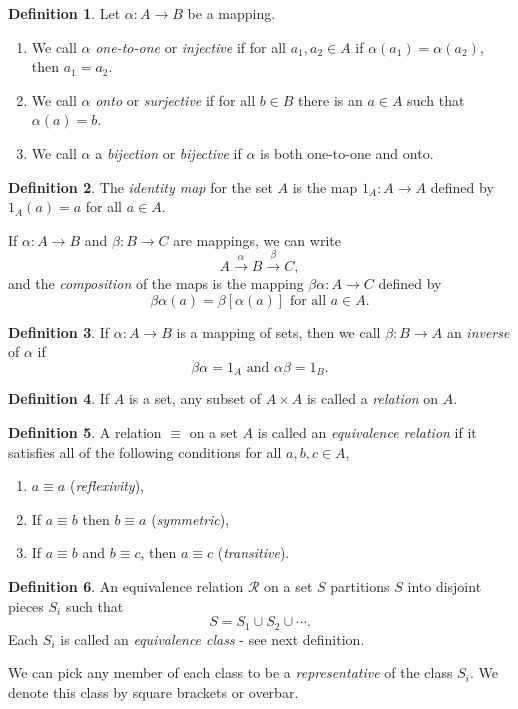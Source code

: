 \documentclass[12pt]{article}
\newcommand{\enumarabic}[1]{
	\begin{enumerate}[label=\textbf{\arabic*.}]
		#1
	\end{enumerate}
}
\newcommand{\enumalph}[1]{
\begin{enumerate}[label=(\alph*)]
	#1
\end{enumerate}
}
\theoremstyle{definition}
\newtheorem*{defn}{Definition}
\begin{document}
\begin{defn}
Let $\alpha:A\to B$ be a mapping.
\enumalph{
	\item We call $\alpha$ \emph{one-to-one} or \emph{injective} if for all $a_1,a_2\in A$ if $\alpha(a_1)=\alpha(a_2)$, then $a_1=a_2$.
	\item We call $\alpha$ \emph{onto} or \emph{surjective} if for all $b\in B$ there is an $a\in A$ such that $\alpha(a)=b$.
	\item We call $\alpha$ a \emph{bijection} or \emph{bijective} if $\alpha$ is both one-to-one and onto.
}

\end{defn}
\begin{defn}
The \emph{identity map} for the set $A$ is the map $1_A:A\to A$ defined by $1_A(a)=a$ for all $a\in A$.

If $\alpha:A\to B$ and $\beta:B\to C$ are mappings, we can write
\[A\xrightarrow{\alpha}B\xrightarrow{\beta}C,\]
and the \emph{composition} of the maps is the mapping $\beta\alpha:A\to C$ defined by
\[\beta\alpha(a)=\beta[\alpha(a)]\text{ for all }a\in A.\]
\end{defn}
\begin{defn}
If $\alpha:A\to B$ is a mapping of sets, then we call $\beta:B\to A$ an \emph{inverse} of $\alpha$ if
\[\beta\alpha = 1_A\text{ and }\alpha\beta=1_B.\]
\end{defn}
\begin{defn}
If $A$ is a set, any subset of $A\times A$ is called a \emph{relation} on $A$.
\end{defn}
\begin{defn}
A relation $\equiv$ on a set $A$ is called an \emph{equivalence relation} if it satisfies all of the following conditions for all $a,b,c\in A$,
\enumarabic{
	\item $a\equiv a$ (\emph{reflexivity}),
	\item If $a\equiv b$ then $b\equiv a$ (\emph{symmetric}),
	\item If $a\equiv b$ and $b\equiv c$, then $a\equiv c$ (\emph{transitive}).
}
\end{defn}
\begin{defn}
An equivalence relation $\mathcal{R}$ on a set $S$ partitions $S$ into disjoint pieces $S_i$ such that 	
\[S=S_1\cup S_2\cup\cdots.\]
Each $S_i$ is called an \emph{equivalence class} - see next definition.

We can pick any member of each class to be a \emph{representative} of the class $S_i$. We denote this class by square brackets or overbar.
\end{defn}
\end{document}
